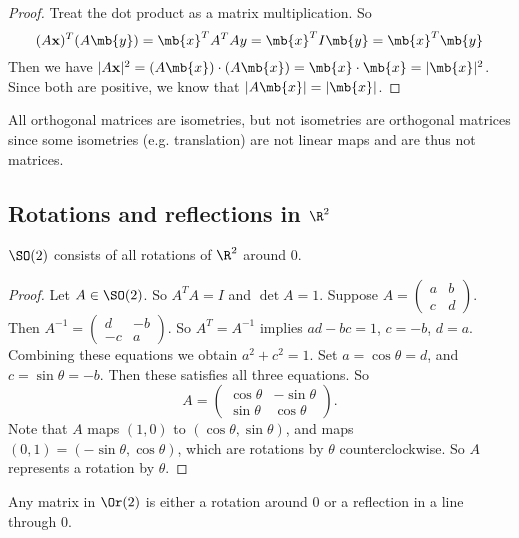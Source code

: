 \documentclass[a4paper]{article}
\begin{document}
  \begin{proof}
    Treat the dot product as a matrix multiplication. So
    \[
      (A\mathbf{x})^T(A\mb{y}) = \mb{x}^{T}A^TAy = \mb{x}^TI\mb{y} = \mb{x}^T\mb{y}
    \]
    Then we have $|A\mathbf{x}|^2 = (A\mb{x})\cdot (A\mb{x}) = \mb{x}\cdot \mb{x} = |\mb{x}|^2$. Since both are positive, we know that $|A\mb{x}| = |\mb{x}|$.
  \end{proof}
  \note All orthogonal matrices are isometries, but not isometries are orthogonal matrices since some isometries (e.g. translation) are not linear maps and are thus not matrices.
  \subsection{Rotations and reflections in \texorpdfstring{$\R^2$}{R2}}
  \begin{lemma}
    $\SO(2)$ consists of all rotations of $\R^2$ around 0.
  \end{lemma}

  \begin{proof}
    Let $A\in \SO(2)$. So $A^TA = I$ and $\det A = 1$. Suppose $A = 
    \begin{pmatrix}
      a & b\\c & d
    \end{pmatrix}$. Then $A^{-1} = 
    \begin{pmatrix}
      d & -b\\-c & a
    \end{pmatrix}.$ So $A^T = A^{-1}$ implies $ad - bc = 1$, $c = -b$, $d = a$. Combining these equations we obtain $a^2 + c^2 = 1$. Set $a = \cos\theta = d$, and $c = \sin\theta = -b$. Then these satisfies all three equations. So
    \[
      A = 
      \begin{pmatrix}
        \cos\theta & -\sin\theta\\
        \sin\theta & \cos\theta
      \end{pmatrix}.
    \]
    Note that $A$ maps $(1, 0)$ to $(\cos\theta, \sin \theta)$, and maps $(0, 1)= (-\sin\theta, \cos\theta)$, which are rotations by $\theta$ counterclockwise. So $A$ represents a rotation by $\theta$.
  \end{proof}

  \begin{cor}
    Any matrix in $\Or(2)$ is either a rotation around $0$ or a reflection in a line through $0$.
  \end{cor}
\end{document}
